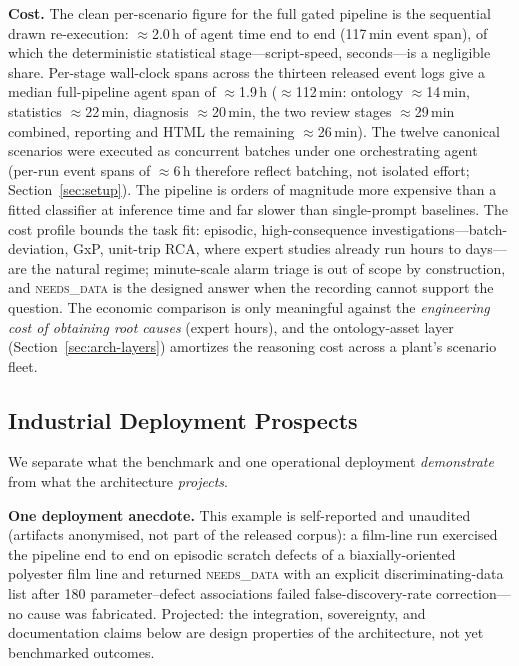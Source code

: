 \documentclass[preprint,10pt]{elsarticle}
\begin{document}
\textbf{Cost.} The clean per-scenario figure for the full gated pipeline is the sequential drawn re-execution: $\approx$2.0\,h of agent time end to end (117\,min event span), of which the deterministic statistical stage---script-speed, seconds---is a negligible share. Per-stage wall-clock spans across the thirteen released event logs give a median full-pipeline agent span of $\approx$1.9\,h ($\approx$112\,min: ontology $\approx$14\,min, statistics $\approx$22\,min, diagnosis $\approx$20\,min, the two review stages $\approx$29\,min combined, reporting and HTML the remaining $\approx$26\,min). The twelve canonical scenarios were executed as concurrent batches under one orchestrating agent (per-run event spans of $\approx$6\,h therefore reflect batching, not isolated effort; Section~\ref{sec:setup}). The pipeline is orders of magnitude more expensive than a fitted classifier at inference time and far slower than single-prompt baselines. The cost profile bounds the task fit: episodic, high-consequence investigations---batch-deviation, GxP, unit-trip RCA, where expert studies already run hours to days---are the natural regime; minute-scale alarm triage is out of scope by construction, and \textsc{needs\_data} is the designed answer when the recording cannot support the question. The economic comparison is only meaningful against the \emph{engineering cost of obtaining root causes} (expert hours), and the ontology-asset layer (Section~\ref{sec:arch-layers}) amortizes the reasoning cost across a plant's scenario fleet.

\subsection{Industrial Deployment Prospects}
We separate what the benchmark and one operational deployment \emph{demonstrate} from what the architecture \emph{projects}.

\textbf{One deployment anecdote.} This example is self-reported and unaudited (artifacts anonymised, not part of the released corpus): a film-line run exercised the pipeline end to end on episodic scratch defects of a biaxially-oriented polyester film line and returned \mbox{\textsc{needs\_data}} with an explicit discriminating-data list after 180 parameter--defect associations failed false-discovery-rate correction---no cause was fabricated. Projected: the integration, sovereignty, and documentation claims below are design properties of the architecture, not yet benchmarked outcomes.
\end{document}
